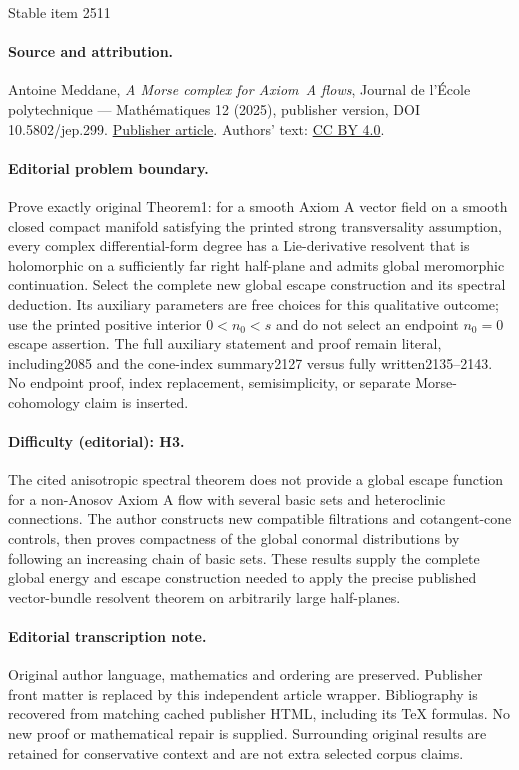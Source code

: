 \documentclass[11pt]{article}
\theoremstyle{definition}
\theoremstyle{plain}
\begin{document}
\begin{center}{\Large Stable item 2511}\end{center}
\paragraph{Source and attribution.}
Antoine Meddane, \emph{A Morse complex for Axiom A flows}, Journal de l’École polytechnique — Mathématiques 12 (2025), publisher version, DOI 10.5802/jep.299. \href{https://jep.centre-mersenne.org/articles/10.5802/jep.299/}{Publisher article}. Authors' text: \href{https://creativecommons.org/licenses/by/4.0/}{CC BY 4.0}.
\paragraph{Editorial problem boundary.}
Prove exactly original Theorem1: for a smooth Axiom A vector field on a smooth closed compact manifold satisfying the printed strong transversality assumption, every complex differential-form degree has a Lie-derivative resolvent that is holomorphic on a sufficiently far right half-plane and admits global meromorphic continuation. Select the complete new global escape construction and its spectral deduction. Its auxiliary parameters are free choices for this qualitative outcome; use the printed positive interior $0<n_0<s$ and do not select an endpoint $n_0=0$ escape assertion. The full auxiliary statement and proof remain literal, including2085 and the cone-index summary2127 versus fully written2135--2143. No endpoint proof, index replacement, semisimplicity, or separate Morse-cohomology claim is inserted.
\paragraph{Difficulty (editorial): H3.}
The cited anisotropic spectral theorem does not provide a global escape function for a non-Anosov Axiom A flow with several basic sets and heteroclinic connections. The author constructs new compatible filtrations and cotangent-cone controls, then proves compactness of the global conormal distributions by following an increasing chain of basic sets. These results supply the complete global energy and escape construction needed to apply the precise published vector-bundle resolvent theorem on arbitrarily large half-planes.
\paragraph{Editorial transcription note.}
Original author language, mathematics and ordering are preserved. Publisher front matter is replaced by this independent article wrapper. Bibliography is recovered from matching cached publisher HTML, including its TeX formulas. No new proof or mathematical repair is supplied. Surrounding original results are retained for conservative context and are not extra selected corpus claims.
\clearpage
\end{document}

